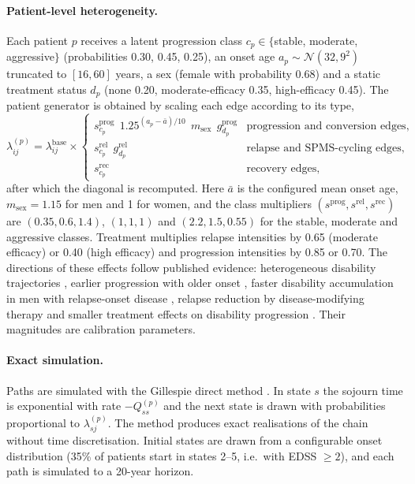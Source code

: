 \documentclass[11pt,a4paper]{article}
\begin{document}
\paragraph{Patient-level heterogeneity.}
Each patient $p$ receives a latent progression class $c_p\in\{$stable, moderate, aggressive$\}$ (probabilities 0.30, 0.45, 0.25), an onset age $a_p\sim\mathcal{N}(32,9^2)$ truncated to $[16,60]$ years, a sex (female with probability 0.68) and a static treatment status $d_p$ (none 0.20, moderate-efficacy 0.35, high-efficacy 0.45). The patient generator is obtained by scaling each edge according to its type,
\begin{equation}
\lambda^{(p)}_{ij} = \lambda^{\mathrm{base}}_{ij}\times
\begin{cases}
s^{\mathrm{prog}}_{c_p}\;\, 1.25^{(a_p-\bar a)/10}\;\, m_{\mathrm{sex}}\;\, g^{\mathrm{prog}}_{d_p} & \text{progression and conversion edges},\\
s^{\mathrm{rel}}_{c_p}\;\, g^{\mathrm{rel}}_{d_p} & \text{relapse and SPMS-cycling edges},\\
s^{\mathrm{rec}}_{c_p} & \text{recovery edges},
\end{cases}
\label{eq:scaling}
\end{equation}
after which the diagonal is recomputed. Here $\bar a$ is the configured mean onset age, $m_{\mathrm{sex}}=1.15$ for men and 1 for women, and the class multipliers $(s^{\mathrm{prog}},s^{\mathrm{rel}},s^{\mathrm{rec}})$ are $(0.35,0.6,1.4)$, $(1,1,1)$ and $(2.2,1.5,0.55)$ for the stable, moderate and aggressive classes. Treatment multiplies relapse intensities by 0.65 (moderate efficacy) or 0.40 (high efficacy) and progression intensities by 0.85 or 0.70. The directions of these effects follow published evidence: heterogeneous disability trajectories \cite{signori2023,guo2026}, earlier progression with older onset \cite{tutuncu2013}, faster disability accumulation in men with relapse-onset disease \cite{ribbons2015}, relapse reduction by disease-modifying therapy \cite{polman2006,mcginley2021,samjoo2023} and smaller treatment effects on disability progression \cite{kappos2018,lublin2022}. Their magnitudes are calibration parameters.

\paragraph{Exact simulation.}
Paths are simulated with the Gillespie direct method \cite{gillespie1977}. In state $s$ the sojourn time is exponential with rate $-Q^{(p)}_{ss}$ and the next state is drawn with probabilities proportional to $\lambda^{(p)}_{sj}$. The method produces exact realisations of the chain without time discretisation. Initial states are drawn from a configurable onset distribution (35\% of patients start in states 2--5, i.e.\ with EDSS $\geq 2$), and each path is simulated to a 20-year horizon.
\end{document}
